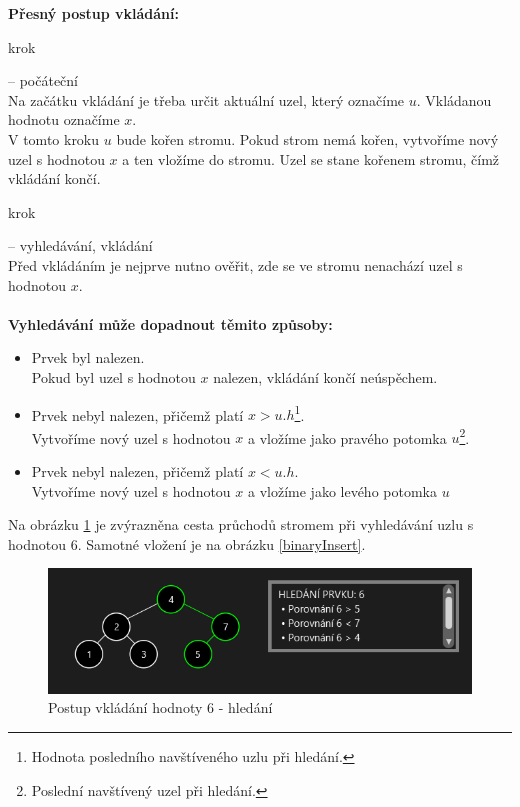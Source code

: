 \documentclass[
  biblatex=false,
  font=serif,
  glossaries=false,
  tables=false,
  theorems=false,
  index
]{kidiplom}
\makeatletter
\newcommand\footnoteref[1]{\protected@xdef\@thefnmark{\ref{#1}}\@footnotemark}
\makeatother
\begin{document}
\noindent \textbf{Přesný postup vkládání:}
\begin{enumerate} {\bfseries
\item  krok} -- počáteční \\
Na začátku vkládání je třeba určit aktuální uzel, který označíme $u$. Vkládanou hodnotu označíme $x$.\\
V tomto kroku $u$ bude kořen stromu. Pokud strom nemá kořen, vytvoříme nový uzel s hodnotou $x$ a ten vložíme do stromu. Uzel se stane kořenem stromu, čímž vkládání končí.
{\bfseries\item  krok} -- vyhledávání, vkládání \\
Před vkládáním je nejprve nutno ověřit, zde se ve stromu nenachází uzel s hodnotou $x$.\\\\
\textbf{Vyhledávání může dopadnout těmito způsoby:}
\begin{itemize}
\item Prvek byl nalezen. \\
Pokud byl uzel s hodnotou $x$ nalezen, vkládání končí neúspěchem.
\item Prvek nebyl nalezen, přičemž platí $x > u.h$\footnote{\label{hodnotaPosledniho}Hodnota posledního navštíveného uzlu při hledání.}.\\
Vytvoříme nový uzel s hodnotou $x$ a vložíme jako pravého potomka $u$\footnote{\label{posledni}Poslední navštívený uzel při hledání.}.
\item Prvek nebyl nalezen, přičemž platí $x < u.h$\footnoteref{hodnotaPosledniho}.\\
Vytvoříme nový uzel s hodnotou $x$ a vložíme jako levého potomka $u$\footnoteref{posledni}
\end{itemize}
\end{enumerate}

\medskip
\noindent Na obrázku \ref{binarySearchInsert} je zvýrazněna cesta průchodů stromem při vyhledávání uzlu s hodnotou 6. Samotné vložení je na obrázku \ref{binaryInsert}.

\begin{figure}[h!]
\centering
	\includegraphics[scale=0.9]{obrazky/6BinarniVkladani1.png}
	\caption{Postup vkládání hodnoty 6 - hledání}
	\label{binarySearchInsert}
\end{figure}
\end{document}
